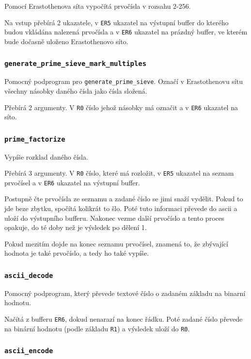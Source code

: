 \documentclass[12pt]{article}
\newcommand{\code}[1]{\mbox{\texttt{#1}}}
\begin{document}
Pomocí Erastothenova síta vypočítá prvočísla v rozsahu 2-256.

Na vstup přebírá 2 ukazatele, v \code{ER5} ukazatel na výstupní buffer do kterého budou vkládána
nalezená prvočísla a v \code{ER6} ukazatel na prázdný buffer, ve kterém bude dočasně uloženo
Erastothenovo síto.

\subsubsection{\code{generate\_prime\_sieve\_mark\_multiples}}

Pomocný podprogram pro \code{generate\_prime\_sieve}. Označí v Erastothenovu sítu všechny násobky
daného čísla jako čísla složená.

Přebírá 2 argumenty. V \code{R0} číslo jehož násobky má označit a v \code{ER6} ukazatel na síto.

\subsubsection{\code{prime\_factorize}}

Vypíše rozklad daného čísla.

Přebírá 3 argumenty. V \code{R0} číslo, které má rozložit, v \code{ER5} ukazatel na seznam 
prvočísel a v \code{ER6} ukazatel na výstupní buffer.

Postupně čte prvočísla ze seznamu a zadané číslo se jimi snaží vydělit. Pokud to jde beze zbytku,
spočítá kolikrát to šlo. Poté tuto informaci převede do ascii a uloží do výstupního bufferu.
Nakonec vezme další prvočíslo a tento proces opakuje, do té doby než je výsledek po dělení 1.

Pokud mezitím dojde na konec seznamu prvočísel, znamená to, že zbývající hodnota je také prvočíslo,
a tedy ho také vypíše.

\subsubsection{\code{ascii\_decode}}

Pomocný podprogram, který převede textové číslo o zadaném základu na binarní hodnotu.

Načítá z bufferu \code{ER6}, dokud nenarazí na konec řádku. Poté zadané číslo převede na binární
hodnotu (podle základu \code{R1}) a výsledek uloží do \code{R0}.

\subsubsection{\code{ascii\_encode}}
\end{document}
